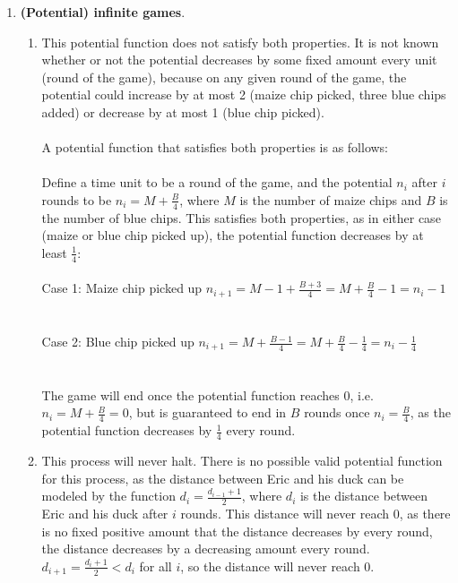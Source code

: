 \documentclass{article}
\begin{document}
\begin{enumerate}
    \item \textbf{(Potential) infinite games}.
    \begin{enumerate}
        \item 
        This potential function does not satisfy both properties. It is not known whether or not the potential decreases by some fixed amount every unit (round of the game), because on any given round of the game, the potential could increase by at most 2 (maize chip picked, three blue chips added) or decrease by at most 1 (blue chip picked). 
        \\\\
        A potential function that satisfies both properties is as follows: 
        \\\\
        Define a time unit to be a round of the game, and the potential $n_i$ after $i$ rounds to be $n_i = M + \frac{B}{4}$, where $M$ is the number of maize chips and $B$ is the number of blue chips. This satisfies both properties, as in either case (maize or blue chip picked up), the potential function decreases by at least $\frac{1}{4}$: 
        \\\\
        Case 1: Maize chip picked up 
        $n_{i+1} = M - 1 + \frac{B + 3}{4} = M + \frac{B}{4} - 1 = n_i - 1$ \\
        \\\\
        Case 2: Blue chip picked up 
        $n_{i+1} = M + \frac{B - 1}{4} = M + \frac{B}{4} - \frac{1}{4} = n_i - \frac{1}{4}$ \\
        \\\\
        The game will end once the potential function reaches 0, i.e. $n_i= M + \frac{B}{4} = 0$, but is guaranteed to end in $B$ rounds once $n_i=\frac{B}{4}$, as the potential function decreases by $\frac{1}{4}$ every round. 

        \item This process will never halt. There is no possible valid potential function for this process, as the distance between Eric and his duck can be modeled by the function $d_i = \frac{d_{i-1} + 1}{2}$, where $d_i$ is the distance between Eric and his duck after $i$ rounds. This distance will never reach 0, as there is no fixed positive amount that the distance decreases by every round, the distance decreases by a decreasing amount every round. $d_{i+1} = \frac{d_i + 1}{2} < d_i$ for all $i$, so the distance will never reach 0.
    \end{enumerate}
    

\end{enumerate}
\end{document}
